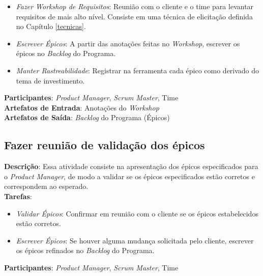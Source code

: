   \begin{itemize}
   \item \indent \textit{Fazer Workshop de Requisitos}: Reunião com o cliente e o time para levantar requisitos de mais alto nível. Consiste
   em uma técnica de elicitação definida no Capítulo \ref{tecnicas}.

   \item \indent \textit{Escrever Épicos}: A partir das anotações feitas no \textit{Workshop},
   escrever os épicos no \textit{Backlog} do Programa.
   
   \item \indent \textit{Manter Rastreabilidade}: Registrar na ferramenta cada épico como derivado do tema de investimento.

  \end{itemize}

  \textbf{Participantes}: \textit{Product Manager}, \textit{Scrum Master}, Time \\

  \textbf{Artefatos de Entrada}: Anotações do \textit{Workshop} \\

  \textbf{Artefatos de Saída}: \textit{Backlog} do Programa (Épicos) \\

\subsection{Fazer reunião de validação dos épicos}
  \textbf{Descrição}: Essa atividade consiste na apresentação dos épicos especificados para o \textit{Product Manager}, de modo a validar se os épicos
  especificados estão corretos e correspondem ao esperado. \\

  \textbf{Tarefas}:

  \begin{itemize}
    \item \indent \textit{Validar Épicos}: Confirmar em reunião com o cliente se os épicos estabelecidos estão corretos.

   \item \indent \textit{Escrever Épicos}: Se houver alguma mudança solicitada pelo cliente, escrever os épicos
   refinados no \textit{Backlog} do Programa.
  \end{itemize}

  \textbf{Participantes}: \textit{Product Manager}, \textit{Scrum Master}, Time \\

